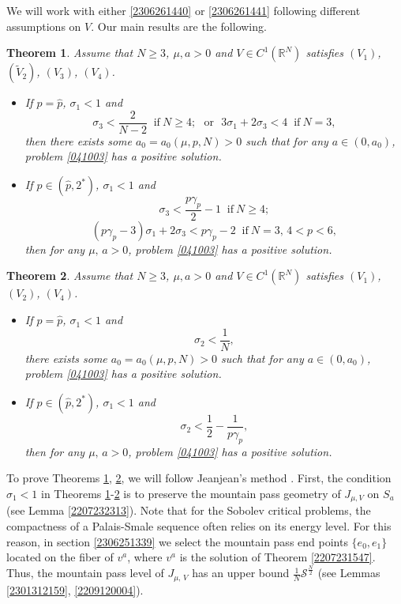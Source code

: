 \documentclass[10pt]{article}
\numberwithin{equation}{section}
\newtheorem{theorem}{Theorem}[section]
\numberwithin{equation}{section}
\begin{document}
We will work with either \eqref{2306261440} or \eqref{2306261441} following different assumptions on $V$. Our main results are the following.
\begin{theorem}\label{22071658}
Assume that $N\ge 3$, $\mu, a>0$ and $V\in C^1(\mathbb{R}^N)$ satisfies $(V_1)$, $(\widetilde{V}_2)$, $(V_3)$, $(V_4)$.
\begin{itemize}
\item[$(i)$] If $p=\hat{p}$, $\sigma_1<1$ and
\begin{equation}\label{2303021949}
\sigma_3<\frac{2}{N-2}\;\;\text{if}~N\ge 4; ~~~\text{or}~~ ~{3\sigma_1 + 2{\sigma_3}} < 4\;\; \text{if}~N=3,
\end{equation}
then there exists some $a_0=a_0(\mu, p, N)>0$ such that for any $a\in (0, a_0)$, problem \eqref{041003} has a positive solution.\par
\item[$(ii)$] If $p\in (\hat{p}, 2^*)$, $\sigma_1<1$ and
\begin{equation}
{\sigma_3} < \frac{p\gamma_p}{2} - 1\;\; \text{if}~N\ge 4;
\end{equation}
\begin{equation}
(p\gamma_p - 3) \sigma_1 + 2\sigma_3 < p\gamma_p - 2\;\; \text{if}~N=3,\, 4<p<6,
\end{equation}
then for any $\mu,\, a>0$, problem \eqref{041003} has a positive solution.
\end{itemize}
\end{theorem}
\begin{theorem}\label{2207241248}
Assume that $N\ge 3$, $\mu, a>0$ and $V\in C^1(\mathbb{R}^N)$ satisfies $(V_1)$, $(V_2)$, $(V_4)$.
\begin{itemize}
\item[$(i)$] If $p=\hat{p}$, $\sigma_1<1$ and
\begin{equation}
\sigma_2<\frac1N,
\end{equation}
there exists some $a_0=a_0(\mu, p, N)>0$ such that for any $a\in (0, a_0)$, problem \eqref{041003} has a positive solution.\par
\item[$(ii)$] If $p\in (\hat{p}, 2^*)$, $\sigma_1<1$ and
\begin{equation}\label{2303021950}
\sigma_2 < \frac12-\frac{1}{p\gamma_p},
\end{equation}
then for any $\mu,\, a>0$, problem \eqref{041003} has a positive solution.
\end{itemize}
\end{theorem}
To prove Theorems \ref{22071658}, \ref{2207241248}, we will follow Jeanjean's method \cite{Jeanjean97}. First, the condition $\sigma_1<1$
in Theorems \ref{22071658}-\ref{2207241248} is to preserve the mountain pass geometry of $J_{\mu, V}$ on $S_a$ (see Lemma \ref{2207232313}). Note that for the Sobolev critical problems, the compactness of a Palais-Smale sequence often relies on its energy level. For this reason, in section \ref{2306251339} we select the mountain pass end points $\{e_0, e_1\}$ located on the fiber of $v^a$, where $v^a$ is the solution of Theorem \ref{2207231547}. Thus, the mountain pass level of $J_{\mu,\, V}$ has an upper bound $\frac{1}{N}\mathcal{S}^{\frac{N}{2}}$ (see Lemmas \ref{2301312159}, \ref{2209120004}). 
\end{document}
